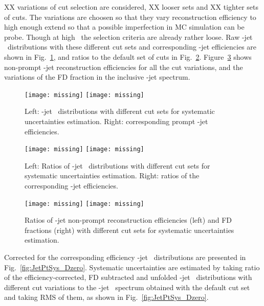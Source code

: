 {\color{red} XX} variations of cut selection are considered, {\color{red} XX} looser sets and {\color{red} XX} tighter sets of cuts. The variations are choosen so that they vary \Dzero reconstruction efficiency to high enough extend so that a possible imperfection in MC simulation can be probe. Though at high \ptd\ the selection criteria are already rather loose.
Raw \Dzero-jet \pt\ distributions with these different cut sets and corresponding \Dzero-jet efficiencies are shown in Fig.~\ref{fig:JetPtRawSys_Dzero}, and ratios to the default set of cuts in Fig.~\ref{fig:JetPtRawSysRatio_Dzero}.
Figure~\ref{fig:JetcutVarFD_Dzero} shows non-prompt \Dzero-jet reconstruction efficiencies for all the cut variations, and the variations of the FD fraction in the inclusive \Dzero-jet spectrum.

\begin{figure}[bth]
\begin{center}
\texttt{[image: missing]}
\texttt{[image: missing]}
\caption{Left: \Dzero-jet \pt\ distributions with different cut sets for systematic uncertainties estimation. Right: corresponding prompt \Dzero-jet efficiencies.} 
\label{fig:JetPtRawSys_Dzero}
\end{center}
\end{figure}

\begin{figure}[bth]
\begin{center}
\texttt{[image: missing]}
\texttt{[image: missing]}
\caption{Left: Ratios of \Dzero-jet \pt\ distributions with different cut sets for systematic uncertainties estimation. Right: ratios of the corresponding \Dzero-jet efficiencies.} 
\label{fig:JetPtRawSysRatio_Dzero}
\end{center}
\end{figure}

\begin{figure}[bth]
\begin{center}
\texttt{[image: missing]}
\texttt{[image: missing]}
\caption{Ratios of \Dzero-jet non-prompt reconstruction efficiencies (left) and FD fractions (right) with different cut sets for systematic uncertainties estimation.} 
\label{fig:JetcutVarFD_Dzero}
\end{center}
\end{figure} 

Corrected for the corresponding efficiency \Dzero-jet \ptchjet\ distributions are presented in Fig.~\ref{fig:JetPtSys_Dzero}. Systematic uncertainties are estimated by taking ratio of the efficiency-corrected, FD subtracted and unfolded \Dzero-jet \ptchjet\ distributions with different cut variations to the \Dzero-jet \pt\ spectrum obtained with the default cut set and taking RMS of them, as shown in Fig.~\ref{fig:JetPtSys_Dzero}.

